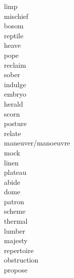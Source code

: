 \documentclass[a4paper, 11pt]{ctexart}
\begin{document}
\begin{multicols*}{3}
\begin{description}
\item[limp]

\item[mischief]

\item[bosom]

\item[reptile]

\item[heave]

\item[pope]

\item[reclaim]

\item[sober]

\item[indulge]

\item[embryo]

\item[herald]

\item[scorn]

\item[posture]

\item[relate]

\item[maneuver/manoeuvre]

\item[mock]

\item[linen]

\item[plateau]

\item[abide]

\item[dome]

\item[patron]

\item[scheme]

\item[thermal]

\item[lumber]

\item[majesty]

\item[repertoire]

\item[obstruction]

\item[propose]


\end{description}
\end{multicols*}
\end{document}
